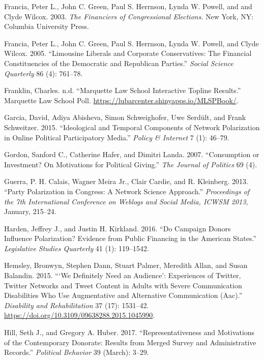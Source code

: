 \documentclass[12pt,]{article}
\begin{document}
\leavevmode\hypertarget{ref-francia2003}{}%
Francia, Peter L., John C. Green, Paul S. Herrnson, Lynda W. Powell, and
and Clyde Wilcox. 2003. \emph{The Financiers of Congressional
Elections}. New York, NY: Columbia University Press.

\leavevmode\hypertarget{ref-francia2005}{}%
Francia, Peter L., John C. Green, Paul S. Herrnson, Lynda W. Powell, and
Clyde Wilcox. 2005. ``Limousine Liberals and Corporate Conservatives:
The Financial Constituencies of the Democratic and Republican Parties.''
\emph{Social Science Quarterly} 86 (4): 761--78.

\leavevmode\hypertarget{ref-mlsp}{}%
Franklin, Charles. n.d. ``Marquette Law School Interactive Topline
Results.'' Marquette Law School Poll.
\url{https://lubarcenter.shinyapps.io/MLSPBook/}.

\leavevmode\hypertarget{ref-garcia2015}{}%
Garcia, David, Adiya Abisheva, Simon Schweighofer, Uwe Serdült, and
Frank Schweitzer. 2015. ``Ideological and Temporal Components of Network
Polarization in Online Political Participatory Media.'' \emph{Policy \&
Internet} 7 (1): 46--79.

\leavevmode\hypertarget{ref-gordon2007}{}%
Gordon, Sanford C., Catherine Hafer, and Dimitri Landa. 2007.
``Consumption or Investment? On Motivations for Political Giving.''
\emph{The Journal of Politics} 69 (4).

\leavevmode\hypertarget{ref-guerra2013}{}%
Guerra, P. H. Calais, Wagner Meira Jr., Clair Cardie, and R. Kleinberg.
2013. ``Party Polarization in Congress: A Network Science Approach.''
\emph{Proceedings of the 7th International Conference on Weblogs and
Social Media, ICWSM 2013}, January, 215--24.

\leavevmode\hypertarget{ref-harden2016}{}%
Harden, Jeffrey J., and Justin H. Kirkland. 2016. ``Do Campaign Donors
Influence Polarization? Evidence from Public Financing in the American
States.'' \emph{Legislative Studies Quarterly} 41 (1): 119--1542.

\leavevmode\hypertarget{ref-hemsley2015}{}%
Hemsley, Bronwyn, Stephen Dann, Stuart Palmer, Meredith Allan, and Susan
Balandin. 2015. ```We Definitely Need an Audience': Experiences of
Twitter, Twitter Networks and Tweet Content in Adults with Severe
Communication Disabilities Who Use Augmentative and Alternative
Communication (Aac).'' \emph{Disability and Rehabilitation} 37 (17):
1531--42. \url{https://doi.org/10.3109/09638288.2015.1045990}.

\leavevmode\hypertarget{ref-hill2017}{}%
Hill, Seth J., and Gregory A. Huber. 2017. ``Representativeness and
Motivations of the Contemporary Donorate: Results from Merged Survey and
Administrative Records.'' \emph{Political Behavior} 39 (March): 3--29.
\end{document}
